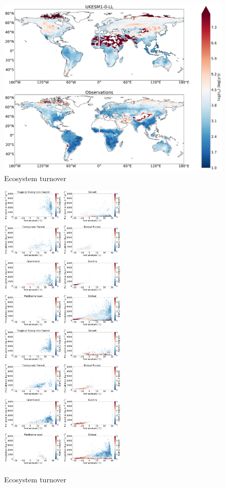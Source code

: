 \documentclass[bg, manuscript]{copernicus}
\begin{document}
\begin{figure}[t]
    \includegraphics[width=12cm]{figs/Turnover/ecosystem_tau_map_comparison.pdf}
    \caption{Ecosystem turnover \label{fig:EcoTurnoverlMap}}
\end{figure}

\begin{figure}[t]
    \includegraphics[width=6cm]{figs/Turnover/UKESM_ecosystem_colouredbytau_biome_log.pdf}
    \includegraphics[width=6cm]{figs/Turnover/obs1_ecosystem_colouredbytau_biome_log.pdf}
    \caption{Ecosystem turnover \label{fig:EcoTurnoverScatter}}
\end{figure}
\end{document}
